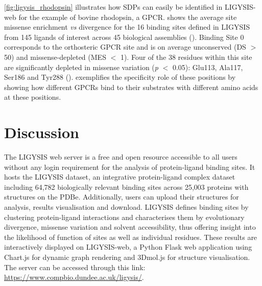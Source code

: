 \autoref{fig:ligysis_rhodopsin} illustrates how SDPs can easily be identified in LIGYSIS-web for the example of bovine rhodopsin, a GPCR.  shows the average site missense enrichment \textit{vs} divergence for the 16 binding sites defined in LIGYSIS from 145 ligands of interest across 45 biological assemblies (). Binding Site 0 corresponds to the orthosteric GPCR site and is on average unconserved (DS $>$ 50) and missense-depleted (MES $<$ 1). Four of the 38 residues within this site are significantly depleted in missense variation (\textit{p} $<$ 0.05): Glu113, Ala117, Ser186 and Tyr288 ().  exemplifies the specificity role of these positions by showing how different GPCRs bind to their substrates with different amino acids at these positions.

\section{Discussion}

The LIGYSIS web server is a free and open resource accessible to all users without any login requirement for the analysis of protein-ligand binding sites. It hosts the LIGYSIS dataset, an integrative protein-ligand complex dataset including 64,782 biologically relevant binding sites across 25,003 proteins with structures on the PDBe. Additionally, users can upload their structures for analysis, results visualisation and download. LIGYSIS defines binding sites by clustering protein-ligand interactions and characterises them by evolutionary divergence, missense variation and solvent accessibility, thus offering insight into the likelihood of function of sites as well as individual residues. These results are interactively displayed on LIGYSIS-web, a Python Flask web application using Chart.js for dynamic graph rendering and 3Dmol.js for structure visualisation. The server can be accessed through this link: \url{https://www.compbio.dundee.ac.uk/ligysis/}.

